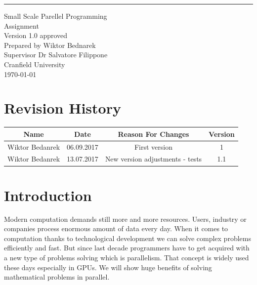 \documentclass{scrreprt}
\date{}
\def\myversion{1.0 }
\begin{document}
\begin{flushright}
    \rule{16cm}{5pt}\vskip1cm
    \begin{bfseries}
        \Huge{Small Scale Parellel Programming\\ Assignment}\\
       
        \vspace{1.9cm}
        \LARGE{Version \myversion approved}\\
        \vspace{1.9cm}
        Prepared by Wiktor Bednarek\\
        \vspace{1.9cm}
        Supervisor Dr Salvatore Filippone \\
        \vspace{1.9cm}
        Cranfield University\\
        \vspace{1.9cm}
        \today\\
    \end{bfseries}
\end{flushright}

\tableofcontents


\chapter*{Revision History}

\begin{center}
    \begin{tabular}{|c|c|c|c|}
        \hline
	    Name & Date & Reason For Changes & Version\\
        \hline
	    Wiktor Bedanrek & 06.09.2017 & First version & 1\\
        \hline
	    Wiktor Bedanrek & 13.07.2017 & New version adjustments - tests & 1.1\\
        \hline
    \end{tabular}
\end{center}

\chapter{Introduction}
Modern computation demands still more and more resources. Users, industry or companies process enormous amount of data every day. When it comes to computation thanks to technological development we can solve complex problems efficiently and fast. But since last decade programmers have to get acquired with a new type of problems solving which is parallelism. That concept is widely used these days especially in GPUs. We will show huge benefits of solving mathematical problems in parallel. 
\end{document}
